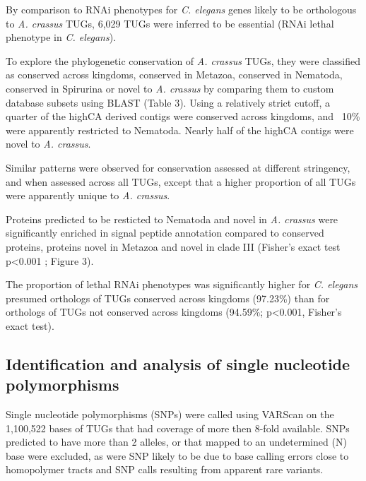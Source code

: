 \documentclass[10pt]{bmc_article}
\newenvironment{bmcformat}{\begin{raggedright}\baselineskip20pt\sloppy\setboolean{publ}{false}}{\end{raggedright}\baselineskip20pt\sloppy}
\begin{document}
\begin{bmcformat}
By comparison to RNAi phenotypes for \textit{C. elegans} genes
\cite{pmid12529635, pmid19910365} likely to be orthologous to
\textit{A. crassus} TUGs, 6,029 TUGs were inferred to be essential
(RNAi lethal phenotype in \textit{C. elegans}).

To explore the phylogenetic conservation of \textit{A. crassus} TUGs,
they were classified as conserved across kingdoms, conserved in
Metazoa, conserved in Nematoda, conserved in Spirurina or novel to
\textit{A. crassus} by comparing them to custom database subsets using
BLAST (Table 3). Using a relatively strict cutoff, a quarter of the
highCA derived contigs were conserved across kingdoms, and ~10\% were
apparently restricted to Nematoda. Nearly half of the highCA contigs
were novel to \textit{A. crassus}.

Similar patterns were observed for conservation assessed at different
stringency, and when assessed across all TUGs, except that a higher
proportion of all TUGs were apparently unique to \textit{A. crassus}.

Proteins predicted to be resticted to Nematoda and novel in
\textit{A. crassus} were significantly enriched in signal peptide
annotation compared to conserved proteins, proteins novel in Metazoa
and novel in clade III (Fisher's exact test p<0.001 ; Figure 3).

The proportion of lethal RNAi phenotypes was significantly higher for
\textit{C. elegans} presumed orthologs of TUGs conserved across
kingdoms (97.23\%) than for orthologs of TUGs not conserved across
kingdoms (94.59\%; p<0.001, Fisher's exact test).

\subsection*{Identification and analysis of single nucleotide
  polymorphisms}

Single nucleotide polymorphisms (SNPs) were called using VARScan
\cite{pmid19542151} on the 1,100,522 bases of TUGs that
had coverage of more then 8-fold available. SNPs predicted to have
more than 2 alleles, or that mapped to an undetermined (N) base were
excluded, as were SNP likely to be due to base calling errors close to
homopolymer tracts and SNP calls resulting from apparent rare
variants. 


\end{bmcformat}
\end{document}
